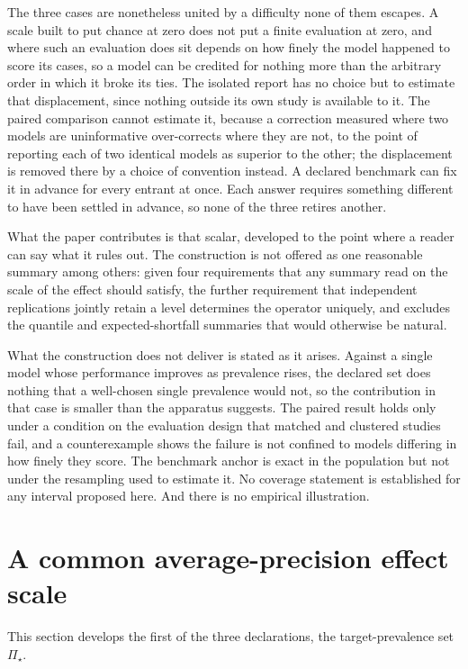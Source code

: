 \documentclass[11pt]{article}
\newcommand{\PSet}{\Pi_\star}
\theoremstyle{remark}
\begin{document}
The three cases are nonetheless united by a difficulty none of them escapes. A scale built to put chance at zero does not put a finite evaluation at zero, and where such an evaluation does sit depends on how finely the model happened to score its cases, so a model can be credited for nothing more than the arbitrary order in which it broke its ties. The isolated report has no choice but to estimate that displacement, since nothing outside its own study is available to it. The paired comparison cannot estimate it, because a correction measured where two models are uninformative over-corrects where they are not, to the point of reporting each of two identical models as superior to the other; the displacement is removed there by a choice of convention instead. A declared benchmark can fix it in advance for every entrant at once. Each answer requires something different to have been settled in advance, so none of the three retires another.

What the paper contributes is that scalar, developed to the point where a reader can say what it rules out. The construction is not offered as one reasonable summary among others: given four requirements that any summary read on the scale of the effect should satisfy, the further requirement that independent replications jointly retain a level determines the operator uniquely, and excludes the quantile and expected-shortfall summaries that would otherwise be natural.

What the construction does not deliver is stated as it arises. Against a single model whose performance improves as prevalence rises, the declared set does nothing that a well-chosen single prevalence would not, so the contribution in that case is smaller than the apparatus suggests. The paired result holds only under a condition on the evaluation design that matched and clustered studies fail, and a counterexample shows the failure is not confined to models differing in how finely they score. The benchmark anchor is exact in the population but not under the resampling used to estimate it. No coverage statement is established for any interval proposed here. And there is no empirical illustration.

\section{A common average-precision effect scale}
\label{sec:common-scale}

This section develops the first of the three declarations, the target-prevalence set $\PSet$.
\end{document}
